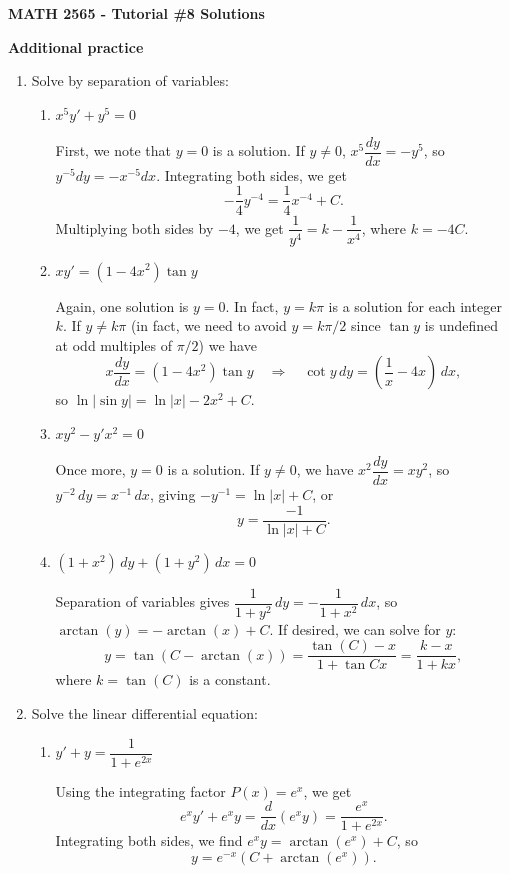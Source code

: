 \documentclass[12pt]{article}
\newcommand{\abs}[1]{\lvert #1\rvert}
\begin{document}
\author{Instructor: Sean Fitzpatrick}
\thispagestyle{empty}
\begin{center}
{\bf MATH 2565 - Tutorial \#8 Solutions}
\end{center}


\textbf{Additional practice}
\begin{enumerate}
\item Solve by separation of variables:
\begin{enumerate}
 \item $x^5y'+y^5=0$

\medskip

First, we note that $y=0$ is a solution. If $y\neq 0$,  $x^5\dfrac{dy}{dx}=-y^5$, so $y^{-5}dy = -x^{-5}dx$. Integrating both sides, we get
 \[
 -\frac14 y^{-4} = \frac14 x^{-4}+C.
 \]
 Multiplying both sides by $-4$, we get $\dfrac{1}{y^4}=k-\dfrac{1}{x^4}$, where $k=-4C$. 
 
 \item $xy'=(1-4x^2)\tan y$
 
 Again, one solution is $y=0$. In fact, $y=k\pi$ is a solution for each integer $k$. If $y\neq k\pi$ (in fact, we need to avoid $y=k\pi/2$ since $\tan y$ is undefined at odd multiples of $\pi/2$) we have
 \[
 x\dfrac{dy}{dx}=(1-4x^2)\tan y \quad\Rightarrow\quad \cot y\,dy = \left(\frac1x -4x\right)\,dx,
 \]
 so $\ln\abs{\sin y} = \ln\abs{x}-2x^2+C$.
 
 \item $xy^2-y'x^2=0$

 Once more, $y=0$ is a solution. If $y\neq 0$, we have $x^2\dfrac{dy}{dx}=xy^2$, so $y^{-2}\,dy = x^{-1}\,dx$, giving $-y^{-1} = \ln\abs{x}+C$, or
 \[
 y = \frac{-1}{\ln\abs{x}+C}.
 \]
 
 \item $(1+x^2)\,dy+(1+y^2)\,dx=0$

 Separation of variables gives $\dfrac{1}{1+y^2}\,dy = -\dfrac{1}{1+x^2}\,dx$, so $\arctan(y) = -\arctan(x)+C$. If desired, we can solve for $y$:
 \[
 y = \tan(C-\arctan(x)) = \frac{\tan(C)-x}{1+\tan{C}x} = \frac{k-x}{1+kx},
 \]
 where $k=\tan(C)$ is a constant.
\end{enumerate}
\newpage


\item Solve the linear differential equation:

\begin{enumerate}
 \item $y'+y=\dfrac{1}{1+e^{2x}}$

Using the integrating factor $P(x)=e^x$, we get
\[
e^xy'+e^xy = \frac{d}{dx}(e^xy) = \dfrac{e^x}{1+e^{2x}}.
\]
Integrating both sides, we find $e^xy = \arctan(e^x)+C$, so
\[
y = e^{-x}(C+\arctan(e^x)).
\]


\end{enumerate}
\end{enumerate}
\end{document}
